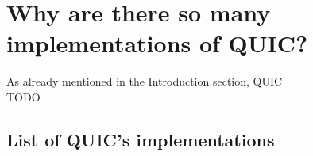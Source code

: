 \documentclass[12pt,a4paper,twoside,openright]{report}
\begin{document}







\section{Why are there so many implementations of QUIC?}


As already mentioned in the Introduction section, QUIC \\
TODO 

\subsection{List of QUIC's implementations}
\end{document}
